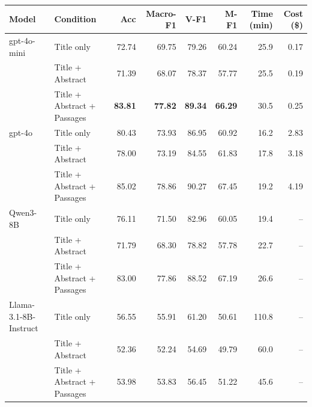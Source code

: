 \begin{tabular}{llrrrrrr}
\toprule
Model & Condition & Acc & Macro-F1 & V-F1 & M-F1 & Time (min) & Cost (\$) \\
\midrule
gpt-4o-mini & Title only & 72.74 & 69.75 & 79.26 & 60.24 & 25.9 & 0.17 \\
 & Title + Abstract & 71.39 & 68.07 & 78.37 & 57.77 & 25.5 & 0.19 \\
 & Title + Abstract + Passages & \textbf{83.81} & \textbf{77.82} & \textbf{89.34} & \textbf{66.29} & 30.5 & 0.25 \\
\midrule
gpt-4o & Title only & 80.43 & 73.93 & 86.95 & 60.92 & 16.2 & 2.83 \\
 & Title + Abstract & 78.00 & 73.19 & 84.55 & 61.83 & 17.8 & 3.18 \\
 & Title + Abstract + Passages & 85.02 & 78.86 & 90.27 & 67.45 & 19.2 & 4.19 \\
\midrule
Qwen3-8B & Title only & 76.11 & 71.50 & 82.96 & 60.05 & 19.4 & -- \\
 & Title + Abstract & 71.79 & 68.30 & 78.82 & 57.78 & 22.7 & -- \\
 & Title + Abstract + Passages & 83.00 & 77.86 & 88.52 & 67.19 & 26.6 & -- \\
\midrule
Llama-3.1-8B-Instruct & Title only & 56.55 & 55.91 & 61.20 & 50.61 & 110.8 & -- \\
 & Title + Abstract & 52.36 & 52.24 & 54.69 & 49.79 & 60.0 & -- \\
 & Title + Abstract + Passages & 53.98 & 53.83 & 56.45 & 51.22 & 45.6 & -- \\
\bottomrule
\end{tabular}
